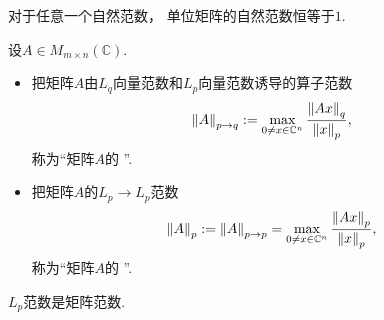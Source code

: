 \begin{property}
对于任意一个自然范数，
单位矩阵的自然范数恒等于\(1\).
\end{property}

\begin{definition}
设\(A \in M_{m \times n}(\mathbb{C})\).
\begin{itemize}
	\item 把矩阵\(A\)由\(L_q\)向量范数和\(L_p\)向量范数诱导的算子范数\begin{equation}
		\norm{A}_{p \to q}
		:=
		\max_{0 \neq x \in \mathbb{C}^n} \frac{ \norm{Ax}_q }{ \norm{x}_p },
	\end{equation}
	称为“矩阵\(A\)的 ”.

	\item 把矩阵\(A\)的\(L_p \to L_p\)范数\begin{equation}
		\norm{A}_p
		:=
		\norm{A}_{p \to p}
		=
		\max_{0 \neq x \in \mathbb{C}^n} \frac{ \norm{Ax}_p }{ \norm{x}_p },
	\end{equation}
	称为“矩阵\(A\)的 ”.
\end{itemize}
\end{definition}

\begin{theorem}
\(L_p\)范数是矩阵范数.
\end{theorem}


